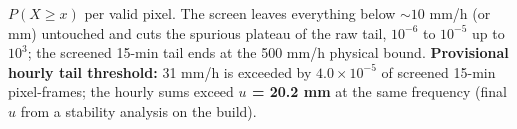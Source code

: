 $P(X \ge x)$ per valid pixel. The screen leaves everything below $\sim 10$ mm/h (or mm) untouched
and cuts the spurious plateau of the \textcolor{rawc}{raw} tail, $10^{-6}$ to $10^{-5}$ up to
$10^3$; the \textcolor{scr}{screened} 15-min tail ends at the 500 mm/h physical bound.
\textbf{Provisional hourly tail threshold:} 31 mm/h is exceeded by $4.0\times10^{-5}$ of screened
15-min pixel-frames; the hourly sums exceed \textbf{$u$ = 20.2 mm} at the same frequency
(final $u$ from a stability analysis on the build).
